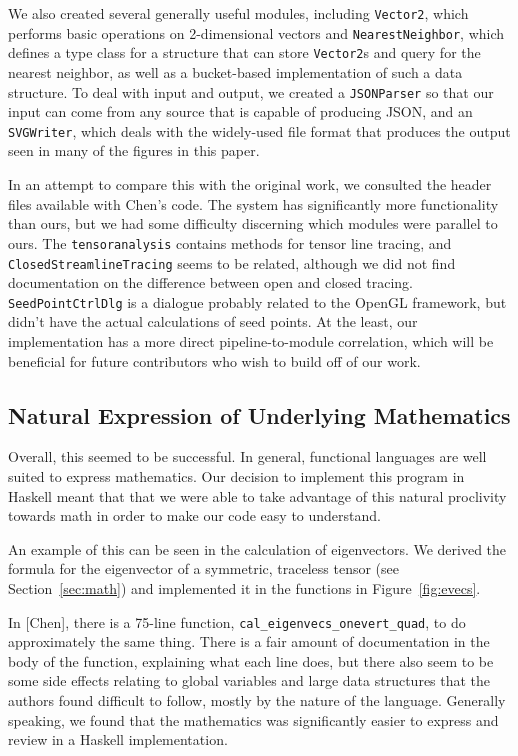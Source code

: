 \documentclass[twocolumn]{article}
\begin{document}
We also created several generally useful modules, including \texttt{Vector2},
which performs basic operations on 2-dimensional vectors and
\texttt{NearestNeighbor}, which defines a type class for a structure that can
store \texttt{Vector2}s and query for the nearest neighbor, as well as a
bucket-based implementation of such a data structure. To deal with input and
output, we created a \texttt{JSONParser} so that our input can come from any
source that is capable of producing JSON, and an \texttt{SVGWriter}, which
deals with the widely-used file format that produces the output seen in many of
the figures in this paper.

In an attempt to compare this with the original work, we consulted the header
files available with Chen’s code. The system has significantly more
functionality than ours, but we had some difficulty discerning which modules
were parallel to ours. The \texttt{tensoranalysis} contains methods for tensor
line tracing, and \texttt{ClosedStreamlineTracing} seems to be related,
although we did not find documentation on the difference between open and
closed tracing. \texttt{SeedPointCtrlDlg} is a dialogue probably related to the
OpenGL framework, but didn’t have the actual calculations of seed points. At
the least, our implementation has a more direct pipeline-to-module correlation,
which will be beneficial for future contributors who wish to build off of our
work.

\subsection{Natural Expression of Underlying Mathematics}
Overall, this seemed to be successful. In general, functional languages are
well suited to express mathematics. Our decision to implement this program in
Haskell meant that that we were able to take advantage of this natural
proclivity towards math in order to make our code easy to understand.

An example of this can be seen in the calculation of eigenvectors. We derived
the formula for the eigenvector of a symmetric, traceless tensor
(see Section~\ref{sec:math}) and implemented it in the functions in
Figure~\ref{fig:evecs}.

In [Chen], there is a 75-line function,
\texttt{cal\_eigenvecs\_onevert\_quad}, to do approximately the same thing. There
is a fair amount of documentation in the body of the function, explaining what
each line does, but there also seem to be some side effects relating to global
variables and large data structures that the authors found difficult to follow,
mostly by the nature of the language.  Generally speaking, we found that the
mathematics was significantly easier to express and review in a Haskell
implementation.
\end{document}
